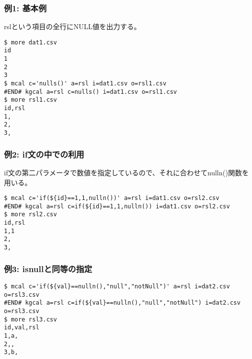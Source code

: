 \subsubsection*{例1: 基本例}

rslという項目の全行にNULL値を出力する。


\begin{Verbatim}[baselinestretch=0.7,frame=single]
$ more dat1.csv
id
1
2
3
$ mcal c='nulls()' a=rsl i=dat1.csv o=rsl1.csv
#END# kgcal a=rsl c=nulls() i=dat1.csv o=rsl1.csv
$ more rsl1.csv
id,rsl
1,
2,
3,
\end{Verbatim}
\subsubsection*{例2: if文の中での利用}

if文の第二パラメータで数値を指定しているので、それに合わせてnulln()関数を用いる。


\begin{Verbatim}[baselinestretch=0.7,frame=single]
$ mcal c='if(${id}==1,1,nulln())' a=rsl i=dat1.csv o=rsl2.csv
#END# kgcal a=rsl c=if(${id}==1,1,nulln()) i=dat1.csv o=rsl2.csv
$ more rsl2.csv
id,rsl
1,1
2,
3,
\end{Verbatim}
\subsubsection*{例3: isnullと同等の指定}



\begin{Verbatim}[baselinestretch=0.7,frame=single]
$ mcal c='if(${val}==nulln(),"null","notNull")' a=rsl i=dat2.csv o=rsl3.csv
#END# kgcal a=rsl c=if(${val}==nulln(),"null","notNull") i=dat2.csv o=rsl3.csv
$ more rsl3.csv
id,val,rsl
1,a,
2,,
3,b,
\end{Verbatim}
